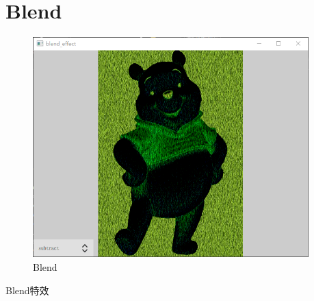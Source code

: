 ﻿




\FloatBarrier
\section{
Blend
}\label{c000015s000002}


\begin{figure}[htb] %
\marginnote{\setlength\fboxsep{2pt}\fbox{\footnotesize{\kaishu\figurename\,}\footnotesize{\ref{p000018}}}}\centering %
\includegraphics[width=0.95\textwidth]{../chapter06/blend_effect/the_app.png} %
\caption{Blend} %
\label{p000018} %
\end{figure}


Blend特效




